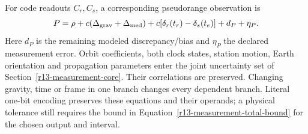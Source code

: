 For code readouts $C_r,C_s$, a corresponding pseudorange observation is
\begin{equation}
 P=\rho+c(\Delta_{\rm grav}+\Delta_{\rm med})
       +c[\delta_r(t_r)-\delta_s(t_e)]+d_P+\eta_P .
 \label{r14-pseudorange}
\end{equation}
Here $d_P$ is the remaining modeled discrepancy/bias and $\eta_P$ the declared
measurement error. Orbit coefficients, both clock states, station motion,
Earth orientation and propagation parameters enter the joint uncertainty
set of Section~\ref{r13-measurement-core}. Their correlations are preserved.
Changing gravity, time or frame in one branch changes every dependent branch.
Literal one-bit encoding preserves these equations and their operands; a
physical tolerance still requires the bound in
Equation~\eqref{r13-measurement-total-bound} for the chosen output and interval.
